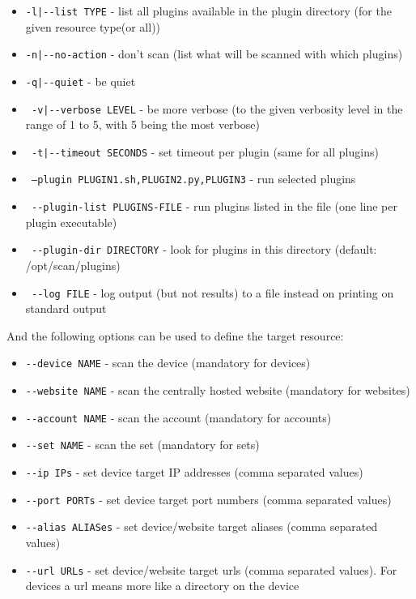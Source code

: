 \begin{itemize}

\item 

    \texttt{-l|-{}-list TYPE} - list all plugins available in the plugin directory 
                       (for the given resource type(or all))
\item                  
    \texttt{-n|-{}-no-action} - don't scan    			     (list what will be scanned with which plugins)
\item    \texttt{-q|-{}-quiet} - be quiet
\item    \texttt{    -v|-{}-verbose LEVEL} - be more verbose 
    	 				 (to the given verbosity level in the range of 1 to 5,
    	 				  with 5 being the most verbose)
\item    \texttt{    -t|-{}-timeout SECONDS} - set timeout per plugin (same for all plugins)
\item    \texttt{    --plugin PLUGIN1.sh,PLUGIN2.py,PLUGIN3} - run selected plugins
\item    \texttt{ -{}-plugin-list PLUGINS-FILE} - run plugins listed in the file (one line per plugin executable)
\item    \texttt{  -{}-plugin-dir DIRECTORY} - look for plugins in this directory (default: /opt/scan/plugins)
\item    \texttt{    -{}-log FILE} - log output (but not results) to a file instead on printing on standard output  

\end{itemize}
And the following options can be used to define the target resource:
\begin{itemize}

    \item    \texttt{-{}-device NAME} - scan the device (mandatory for devices)
    \item    \texttt{-{}-website NAME} - scan the centrally hosted website (mandatory for websites)
    \item    \texttt{-{}-account NAME} - scan the account (mandatory for accounts)
    \item    \texttt{-{}-set NAME} - scan the set (mandatory for sets)
    \item    \texttt{-{}-ip IPs} - set device target IP addresses (comma separated values)
    \item    \texttt{-{}-port PORTs} - set device target port numbers (comma separated values)
    \item    \texttt{-{}-alias ALIASes} - set device/website target aliases (comma separated values)
    \item    \texttt{-{}-url URLs} - set device/website target urls (comma separated values). For devices a url means more like a directory on the device 
   \end{itemize}
   


